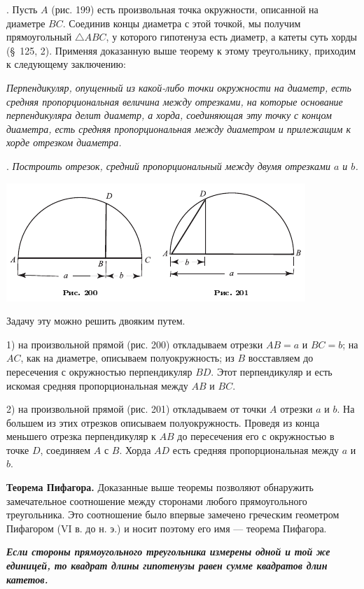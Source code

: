\documentclass[oneside]{book}
\begin{document}
.
Пусть $A$ (рис. 199) есть произвольная точка окружности, описанной на диаметре $BC$.
Соединив концы диаметра с этой точкой, мы получим прямоугольный $\triangle ABC$, у которого гипотенуза есть диаметр, а катеты суть хорды (§~125, 2).
Применяя доказанную выше теорему к этому треугольнику, приходим к следующему заключению:

\emph{Перпендикуляр, опущенный из какой-либо точки окружности на диаметр, есть средняя пропорциональная величина между отрезками, на которые основание перпендикуляра делит диаметр, а хорда, соединяющая эту точку с концом диаметра, есть средняя пропорциональная между диаметром и прилежащим к хорде отрезком диаметра.}

.
\emph{Построить отрезок, средний пропорциональный между двумя отрезками $a$ и $b$.}

\includegraphics{pics/ris-200-201}

Задачу эту можно решить двояким путем. %

1) на произвольной прямой (рис. 200) откладываем отрезки $AB=a$ и $BC=b$;
на $AC$, как на диаметре, описываем полуокружность;
из $B$ восставляем до пересечения с окружностью перпендикуляр $BD$.
Этот перпендикуляр и есть искомая средняя пропорциональная между $AB$ и $BC$.

2) на произвольной прямой (рис. 201) откладываем от точки $A$ отрезки $a$ и $b$.
На большем из этих отрезков описываем полуокружность.
Проведя из конца меньшего отрезка перпендикуляр к $AB$ до пересечения его с окружностью в точке $D$, соединяем $A$ с $B$.
Хорда $AD$ есть средняя пропорциональная между $a$ и $b$.

\textbf{Теорема Пифагора.}
Доказанные выше теоремы позволяют обнаружить замечательное соотношение между сторонами любого прямоугольного треугольника.
Это соотношение было впервые замечено греческим геометром Пифагором (VI в.
до н. э.) и носит поэтому его имя — теорема Пифагора. %

\textbf{\emph{Если стороны прямоугольного треугольника измерены одной и той же единицей, то квадрат длины гипотенузы равен сумме квадратов длин катетов.}}
\end{document}
